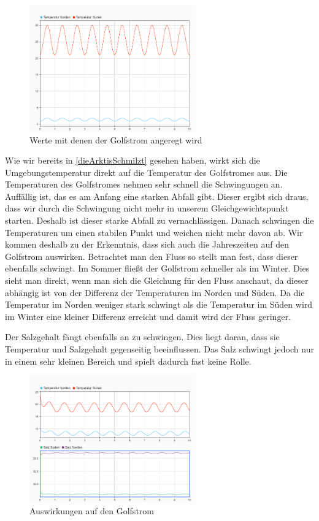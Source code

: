 \documentclass[a4paper,twoside]{article}
\begin{document}
	\begin{figure}[!h]
  		\centering
 		\includegraphics[width=7cm]{../Diagramme/Jahreszeiten_init.png}
  		\caption{Werte mit denen der Golfstrom angeregt wird}
  		\label{fig:jahreszeitenUmgebung}
	\end{figure}
	
	Wie wir bereits in \ref{dieArktisSchmilzt} gesehen haben, wirkt sich die Umgebungstemperatur direkt auf die Temperatur des Golfstromes aus. Die Temperaturen des Golfstromes nehmen sehr schnell die Schwingungen an. Auffällig ist, das es am Anfang eine starken Abfall gibt. Dieser ergibt sich draus, dass wir durch die Schwingung nicht mehr in unserem Gleichgewichtspunkt starten. Deshalb ist dieser starke Abfall zu vernachlässigen. Danach schwingen die Temperaturen um einen stabilen Punkt und weichen nicht mehr davon ab. Wir kommen deshalb zu der Erkenntnis, dass sich auch die Jahreszeiten auf den Golfstrom auswirken. Betrachtet man den Fluss so stellt man fest, dass dieser ebenfalls schwingt. Im Sommer fließt der Golfstrom schneller als im Winter. Dies sieht man direkt, wenn man sich die Gleichung für den Fluss anschaut, da dieser abhängig ist von der Differenz der Temperaturen im Norden und Süden. Da die Temperatur im Norden weniger stark schwingt als die Temperatur im Süden wird im Winter eine kleiner Differenz erreicht und damit wird der Fluss geringer.
	
	Der Salzgehalt fängt ebenfalls an zu schwingen. Dies liegt daran, dass sie Temperatur und Salzgehalt gegenseitig beeinflussen. Das Salz schwingt jedoch nur in einem sehr kleinen Bereich und spielt dadurch fast keine Rolle.

	\begin{figure}[!h]
  		\centering
 		\includegraphics[width=7cm]{../Diagramme/Jahreszeiten_werte.png}
  		\caption{Auswirkungen auf den Golfstrom}
  		\label{fig:jahreszeitenGolf}
	\end{figure}
\end{document}
